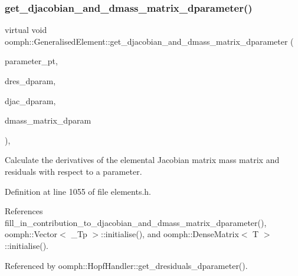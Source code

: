 \subsubsection{\texorpdfstring{get\+\_\+djacobian\+\_\+and\+\_\+dmass\+\_\+matrix\+\_\+dparameter()}{get\_djacobian\_and\_dmass\_matrix\_dparameter()}}
{\footnotesize\ttfamily virtual void oomph\+::\+Generalised\+Element\+::get\+\_\+djacobian\+\_\+and\+\_\+dmass\+\_\+matrix\+\_\+dparameter (\begin{DoxyParamCaption}\item[{double $\ast$const \&}]{parameter\+\_\+pt,  }\item[{\hyperlink{classoomph_1_1Vector}{Vector}$<$ double $>$ \&}]{dres\+\_\+dparam,  }\item[{\hyperlink{classoomph_1_1DenseMatrix}{Dense\+Matrix}$<$ double $>$ \&}]{djac\+\_\+dparam,  }\item[{\hyperlink{classoomph_1_1DenseMatrix}{Dense\+Matrix}$<$ double $>$ \&}]{dmass\+\_\+matrix\+\_\+dparam }\end{DoxyParamCaption})\hspace{0.3cm}{\ttfamily [inline]}, {\ttfamily [virtual]}}



Calculate the derivatives of the elemental Jacobian matrix mass matrix and residuals with respect to a parameter. 



Definition at line 1055 of file elements.\+h.



References fill\+\_\+in\+\_\+contribution\+\_\+to\+\_\+djacobian\+\_\+and\+\_\+dmass\+\_\+matrix\+\_\+dparameter(), oomph\+::\+Vector$<$ \+\_\+\+Tp $>$\+::initialise(), and oomph\+::\+Dense\+Matrix$<$ T $>$\+::initialise().



Referenced by oomph\+::\+Hopf\+Handler\+::get\+\_\+dresiduals\+\_\+dparameter().

\mbox{\label{classoomph_1_1GeneralisedElement_ab92de6f9c750735bc660f0a10f0df44c}} 
